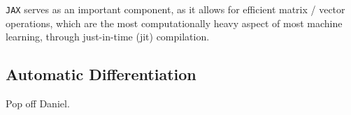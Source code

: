 \verb|JAX| serves as an important component, as it allows for efficient matrix / vector operations, which are the most computationally heavy aspect of most machine learning, through just-in-time (jit) compilation.

\subsection{Automatic Differentiation}\label{sec:autodiff}
Pop off Daniel.
